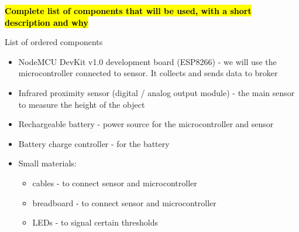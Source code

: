 \documentclass{article}
\begin{document}
\textcolor{red}{\textbf{\hl{Complete list of components that will be used, with a short description and why}}}

List of ordered components
\begin{itemize}
\item NodeMCU DevKit v1.0 development board (ESP8266) - we will use the microcontroller connected to sensor. It collects and sends data to broker
\item Infrared proximity sensor (digital / analog output module) - the main sensor to measure the height of the object
\item Rechargeable battery - power source for the microcontroller and sensor
\item Battery charge controller - for the battery
\item Small materials: 
	\begin{itemize}
		\item cables - to connect sensor and microcontroller
		\item breadboard - to connect sensor and microcontroller
		\item LEDs - to signal certain thresholds
	\end{itemize}
\end{itemize}
\end{document}
